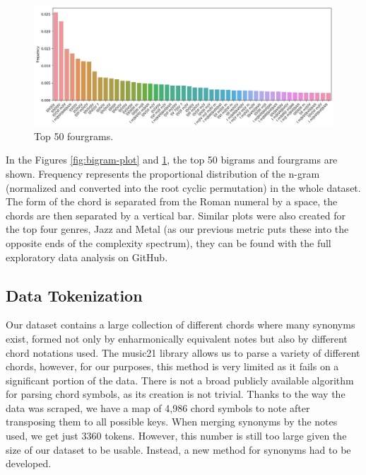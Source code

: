 \documentclass{article}
\begin{document}
\begin{figure}[!htbp]
    \centering
    \includegraphics[width=\linewidth]{images/fourgram-plot.png}
    \caption{Top 50 fourgrams.}
    \label{fig:fourgram-plot}
\end{figure}

In the Figures \ref{fig:bigram-plot} and \ref{fig:fourgram-plot}, the top 50 bigrams and fourgrams are shown. Frequency represents the proportional distribution of the n-gram (normalized and converted into the root cyclic permutation) in the whole dataset. The form of the chord is separated from the Roman numeral by a space, the chords are then separated by a vertical bar. Similar plots were also created for the top four genres, Jazz and Metal (as our previous metric puts these into the opposite ends of the complexity spectrum), they can be found with the full exploratory data analysis on GitHub.

\subsection{Data Tokenization} \label{Data Tokenization}

Our dataset contains a large collection of different chords where many synonyms exist, formed not only by enharmonically equivalent notes but also by different chord notations used. The music21 library \cite{music21} allows us to parse a variety of different chords, however, for our purposes, this method is very limited as it fails on a significant portion of the data. There is not a broad publicly available algorithm for parsing chord symbols, as its creation is not trivial. Thanks to the way the data was scraped, we have a map of 4,986 chord symbols to note after transposing them to all possible keys. When merging synonyms by the notes used, we get just 3360 tokens. However, this number is still too large given the size of our dataset to be usable. Instead, a new method for synonyms had to be developed.
\end{document}
